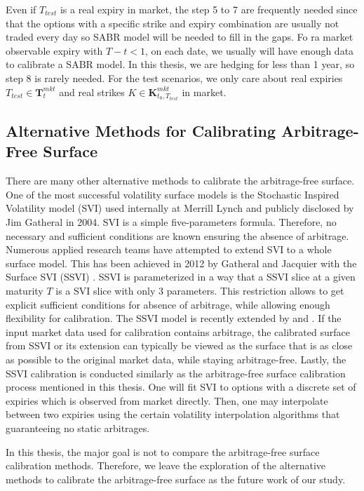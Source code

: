 \documentclass[letterpaper,12pt,titlepage,oneside,final]{book}
\numberwithin{equation}{section}
\theoremstyle{definition}
\begin{document}
Even if $T_{test}$ is a real expiry in market, the step 5 to 7 are frequently needed since that the options with a specific strike and expiry combination are usually not traded every day so SABR model will be needed to fill in the gaps. 
Fo ra  market observable expiry with $T-t<1$, on each date, we usually will have enough data to calibrate a SABR model. In this thesis, we are hedging for less than 1 year, so step 8 is rarely needed. For the test scenarios, we only care about real expiries  $T_{test} \in \mathbf{T}_t^{mkt}$ and real strikes $K \in \mathbf{K}^{mkt}_{t_0,T_{test}}$ in market. 


\subsection{Alternative Methods for Calibrating Arbitrage-Free Surface}
There are many other alternative methods to calibrate the arbitrage-free surface. One of the most successful volatility surface models is the Stochastic Inspired Volatility model (SVI) \cite{gatheral2004parsimonious} used internally at Merrill Lynch and publicly disclosed by Jim Gatheral in 2004.  SVI is a simple  five-parameters formula. Therefore, no necessary and sufficient conditions are known ensuring the absence of arbitrage. Numerous applied research teams have attempted to extend SVI to a whole surface model. This has been achieved in 2012 by Gatheral and Jacquier with the Surface SVI (SSVI) \cite{gatheral2014arbitrage}. SSVI is parameterized in a way that a  SSVI slice at a given maturity $T$ is a SVI slice with only 3 parameters. This restriction allows to get explicit sufficient conditions for absence of arbitrage, while allowing enough flexibility for calibration. The SSVI model is recently extended by \cite{hendriks2017extended} and \cite{corbetta2019robust}. If the input market data used for calibration contains arbitrage, the calibrated surface from SSVI \cite{gatheral2014arbitrage} or its extension \cite{hendriks2017extended,corbetta2019robust} can typically be viewed as the surface that is as close as possible to the original market data, while staying arbitrage-free. Lastly, the SSVI calibration is conducted similarly as the arbitrage-free surface calibration process mentioned in this thesis. One will fit SVI to options with a discrete set of expiries which is observed from market directly. Then, one may interpolate between two expiries using the certain volatility interpolation algorithms that  guaranteeing no static arbitrages. 

In this thesis, the major goal is not to compare the arbitrage-free surface calibration methods. Therefore, we leave the exploration of the alternative methods to calibrate the arbitrage-free surface as the future work of our study. 
\end{document}
